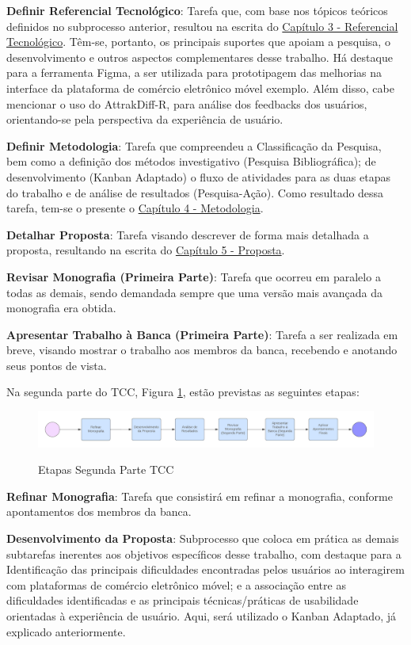 \textbf{Definir Referencial Tecnológico}: Tarefa que, com base nos tópicos teóricos definidos no subprocesso anterior, resultou na escrita do \hyperref[chap:ReferencialTeorico]{Capítulo 3 - Referencial Tecnológico}. Têm-se, portanto, os principais suportes que apoiam a pesquisa, o desenvolvimento e outros aspectos complementares desse trabalho. Há destaque para a ferramenta Figma, a ser utilizada para prototipagem das melhorias na interface da plataforma de comércio eletrônico móvel exemplo. Além disso, cabe mencionar o uso do AttrakDiff-R, para análise dos feedbacks dos usuários, orientando-se pela perspectiva da experiência de usuário.

\textbf{Definir Metodologia}: Tarefa que compreendeu a Classificação da Pesquisa, bem como a definição dos métodos investigativo (Pesquisa Bibliográfica); de desenvolvimento (Kanban Adaptado) o fluxo de atividades para as duas etapas do trabalho e de análise de resultados (Pesquisa-Ação). Como resultado dessa tarefa, tem-se o presente o \hyperref[chap:Metodologia]{Capítulo 4 - Metodologia}. 

\textbf{Detalhar Proposta}: Tarefa visando descrever de forma mais detalhada a proposta, resultando na escrita do \hyperref[chap:Proposta]{Capítulo 5 - Proposta}.

\textbf{Revisar Monografia (Primeira Parte)}: Tarefa que ocorreu em paralelo a todas as demais, sendo demandada sempre que uma versão mais avançada da monografia era obtida.

\textbf{Apresentar Trabalho à Banca (Primeira Parte)}: Tarefa a ser realizada em breve, visando mostrar o trabalho aos membros da banca, recebendo e anotando seus pontos de vista.

Na segunda parte do TCC, Figura \ref{fig07}, estão previstas as seguintes etapas:

\begin{figure}[ht]
    \centering
    \caption{Etapas Segunda Parte TCC}
    \includegraphics[keepaspectratio=true,scale=0.2]{figuras/cap04Fluxograma2.png}
    \label{fig07}
\end{figure}

\textbf{Refinar Monografia}: Tarefa que consistirá em refinar a monografia, conforme apontamentos dos membros da banca.

\textbf{Desenvolvimento da Proposta}: Subprocesso que coloca em prática as demais subtarefas inerentes aos objetivos específicos desse trabalho, com destaque para a Identificação das principais dificuldades encontradas pelos usuários ao interagirem com plataformas de comércio eletrônico móvel; e a associação entre as dificuldades identificadas e as principais técnicas/práticas de usabilidade orientadas à experiência de usuário. Aqui, será utilizado o Kanban Adaptado, já explicado anteriormente.

